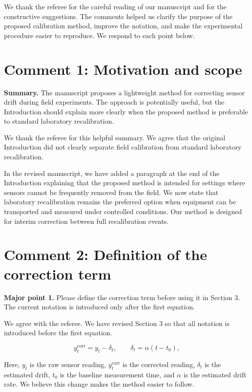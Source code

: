 We thank the referee for the careful reading of our manuscript and for the constructive suggestions. The comments helped us clarify the purpose of the proposed calibration method, improve the notation, and make the experimental procedure easier to reproduce. We respond to each point below.

\section*{Comment 1: Motivation and scope}
\begin{refereecomment}
\textbf{Summary.} The manuscript proposes a lightweight method for correcting sensor drift during field experiments. The approach is potentially useful, but the Introduction should explain more clearly when the proposed method is preferable to standard laboratory recalibration.
\end{refereecomment}

\begin{authorreply}
We thank the referee for this helpful summary. We agree that the original Introduction did not clearly separate field calibration from standard laboratory recalibration.

In the revised manuscript, we have added a paragraph at the end of the Introduction explaining that the proposed method is intended for settings where sensors cannot be frequently removed from the field. We now state that laboratory recalibration remains the preferred option when equipment can be transported and measured under controlled conditions. Our method is designed for interim correction between full recalibration events.
\end{authorreply}

\section*{Comment 2: Definition of the correction term}
\begin{refereecomment}
\textbf{Major point 1.} Please define the correction term before using it in Section 3. The current notation is introduced only after the first equation.
\end{refereecomment}

\begin{authorreply}
We agree with the referee. We have revised Section 3 so that all notation is introduced before the first equation.

\begin{replyformula}
\[
  y_t^{\mathrm{corr}} = y_t - \delta_t,
  \qquad
  \delta_t = \alpha(t-t_0),
\]
\end{replyformula}

Here, \(y_t\) is the raw sensor reading, \(y_t^{\mathrm{corr}}\) is the corrected reading, \(\delta_t\) is the estimated drift, \(t_0\) is the baseline measurement time, and \(\alpha\) is the estimated drift rate. We believe this change makes the method easier to follow.
\end{authorreply}


